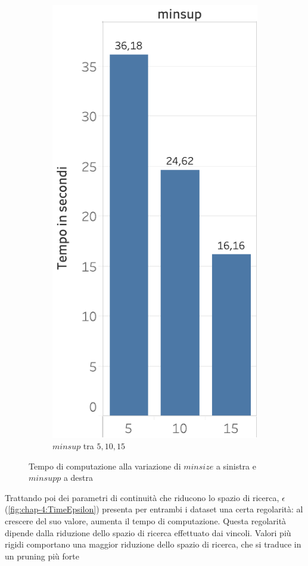 \begin{figure}
\begin{subfigure}{.5\textwidth}
   \includegraphics[scale=0.5]{res/fig/sec-4/performance/TimeMisupp.pdf}
   \caption{\(minsup\) tra \(5,10,15\)}%
  \label{fig:chap-4:TimeMinsupp}
  \end{subfigure}%
  \caption{Tempo di computazione alla variazione di \(minsize\) a sinistra e \(minsupp\) a destra}%
  \label{fig:chap-4:TimeMinsizeandMinsupp}
\end{figure}

Trattando poi dei parametri di continuità che riducono lo spazio di ricerca, \(\epsilon\) (\cref{fig:chap-4:TimeEpsilon}) presenta per entrambi i dataset una certa regolarità: al crescere del suo valore, aumenta il tempo di computazione.
Questa regolarità dipende dalla riduzione dello spazio di ricerca effettuato dai vincoli.
Valori più rigidi comportano una maggior riduzione dello spazio di ricerca, che si traduce in un pruning più forte

